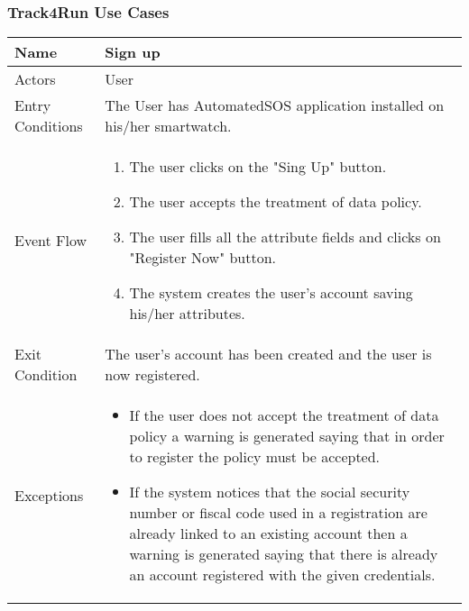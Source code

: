\subsubsection{Track4Run Use Cases}
\begin{table}[h]
\begin{tabular}{|l|l|}
\hline
Name             & Sign up \\ \hline
Actors           & User  \\ \hline
Entry Conditions & The User has AutomatedSOS application installed on his/her smartwatch.    \\ \hline
Event Flow       & \parbox{.45\textwidth}{\begin{enumerate}
            \item The user clicks on the "Sing Up" button.
            \item The user accepts the treatment of data policy.
            \item The user fills all the attribute fields and clicks on "Register Now" button.
            \item The system creates the user's account saving his/her attributes.
        \end{enumerate}}\\ \hline
Exit Condition   & The user's account has been created and the user is now registered.\\ \hline
Exceptions       & \parbox{.45\textwidth}  
{\begin{itemize}
\item If the user does not accept the treatment of data policy a warning is generated saying that in order to register the policy must be accepted.
\item If the system notices that the social security number or fiscal code used in a registration are already linked to an existing account then a warning is generated saying that there is already an account registered with the given credentials.
\end{itemize}}\\ \hline
\end{tabular}
\end{table}

